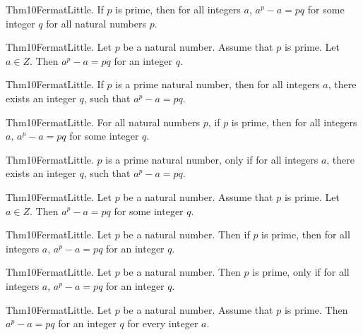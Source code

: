 \documentclass{article}
\begin{document}
Thm10FermatLittle. If $p$ is prime, then for all integers $a$, $a ^ {p}- a = p q$ for some integer $q$ for all natural numbers $p$.

Thm10FermatLittle. Let $p$ be a natural number. Assume that $p$ is prime. Let $a \in Z$. Then $a ^ {p}- a = p q$ for an integer $q$.

Thm10FermatLittle. If $p$ is a prime natural number, then for all integers $a$, there exists an integer $q$, such that $a ^ {p}- a = p q$.

Thm10FermatLittle. For all natural numbers $p$, if $p$ is prime, then for all integers $a$, $a ^ {p}- a = p q$ for some integer $q$.

Thm10FermatLittle. $p$ is a prime natural number, only if for all integers $a$, there exists an integer $q$, such that $a ^ {p}- a = p q$.

Thm10FermatLittle. Let $p$ be a natural number. Assume that $p$ is prime. Let $a \in Z$. Then $a ^ {p}- a = p q$ for some integer $q$.

Thm10FermatLittle. Let $p$ be a natural number. Then if $p$ is prime, then for all integers $a$, $a ^ {p}- a = p q$ for an integer $q$.

Thm10FermatLittle. Let $p$ be a natural number. Then $p$ is prime, only if for all integers $a$, $a ^ {p}- a = p q$ for an integer $q$.

Thm10FermatLittle. Let $p$ be a natural number. Assume that $p$ is prime. Then $a ^ {p}- a = p q$ for an integer $q$ for every integer $a$.
\end{document}
